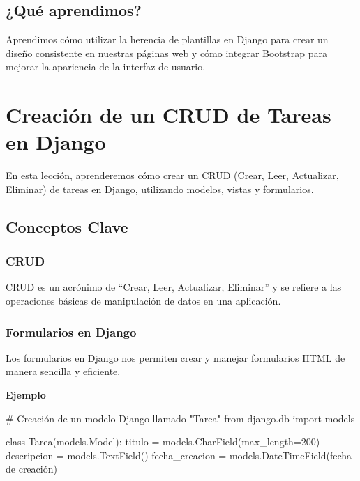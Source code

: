 \documentclass[
  a4paper,
  DIV=11,
  numbers=noendperiod,
  onepage,
  openany]{scrreprt}
\newenvironment{Shaded}{\begin{snugshade}}{\end{snugshade}}
\newcommand{\CommentTok}[1]{\textcolor[rgb]{0.37,0.37,0.37}{#1}}
\newcommand{\DecValTok}[1]{\textcolor[rgb]{0.68,0.00,0.00}{#1}}
\newcommand{\ImportTok}[1]{\textcolor[rgb]{0.00,0.46,0.62}{#1}}
\newcommand{\KeywordTok}[1]{\textcolor[rgb]{0.00,0.23,0.31}{#1}}
\newcommand{\NormalTok}[1]{\textcolor[rgb]{0.00,0.23,0.31}{#1}}
\newcommand{\OperatorTok}[1]{\textcolor[rgb]{0.37,0.37,0.37}{#1}}
\newcommand{\StringTok}[1]{\textcolor[rgb]{0.13,0.47,0.30}{#1}}
\begin{document}
\section{¿Qué aprendimos?}\label{quuxe9-aprendimos-25}

Aprendimos cómo utilizar la herencia de plantillas en Django para crear
un diseño consistente en nuestras páginas web y cómo integrar Bootstrap
para mejorar la apariencia de la interfaz de usuario.

\chapter{Creación de un CRUD de Tareas en
Django}\label{creaciuxf3n-de-un-crud-de-tareas-en-django}

En esta lección, aprenderemos cómo crear un CRUD (Crear, Leer,
Actualizar, Eliminar) de tareas en Django, utilizando modelos, vistas y
formularios.

\section{Conceptos Clave}\label{conceptos-clave-30}

\subsection{CRUD}\label{crud}

CRUD es un acrónimo de ``Crear, Leer, Actualizar, Eliminar'' y se
refiere a las operaciones básicas de manipulación de datos en una
aplicación.

\subsection{Formularios en Django}\label{formularios-en-django}

Los formularios en Django nos permiten crear y manejar formularios HTML
de manera sencilla y eficiente.

\textbf{Ejemplo}

\begin{Shaded}
\begin{Highlighting}[]

\CommentTok{\# Creación de un modelo Django llamado "Tarea"}
\ImportTok{from}\NormalTok{ django.db }\ImportTok{import}\NormalTok{ models}

\KeywordTok{class}\NormalTok{ Tarea(models.Model):}
\NormalTok{    titulo }\OperatorTok{=}\NormalTok{ models.CharField(max\_length}\OperatorTok{=}\DecValTok{200}\NormalTok{)}
\NormalTok{    descripcion }\OperatorTok{=}\NormalTok{ models.TextField()}
\NormalTok{    fecha\_creacion }\OperatorTok{=}\NormalTok{ models.DateTimeField(}\StringTok{\textquotesingle{}fecha de creación\textquotesingle{}}\NormalTok{)}
\end{Highlighting}
\end{Shaded}
\end{document}
